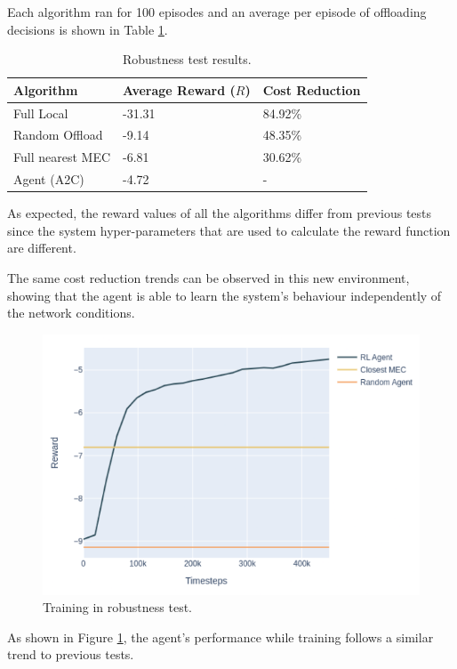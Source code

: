 \documentclass[conference]{IEEEtran}
\begin{document}
Each algorithm ran for 100 episodes and an average per episode of offloading decisions is shown in Table \ref{robust_table}.

\begin{table}[H]
\centering
\begin{tabular}{|l|l|l|}
\hline
Algorithm        & Average Reward ($R$) & Cost Reduction\\ \hline
Full Local       & -31.31 & 84.92\%\\
Random Offload   & -9.14 & 48.35\%\\
Full nearest MEC & -6.81 & 30.62\%\\ 
Agent (A2C) & -4.72 & -\\ \hline
\end{tabular}
\caption{Robustness test results.} \label{robust_table}
\end{table}

As expected, the reward values of all the algorithms differ from previous tests since the system hyper-parameters that are used to calculate the reward function are different.

The same cost reduction trends can be observed in this new environment, showing that the agent is able to learn the system's behaviour independently of the network conditions.

\begin{figure}[H]
  \centering
  \includegraphics[width=\linewidth]{images/5_10_training_new.png}
  \caption{Training in robustness test.}  \label{robust_training}
\end{figure}

As shown in Figure \ref{robust_training}, the agent's performance while training follows a similar trend to previous tests.
\end{document}

